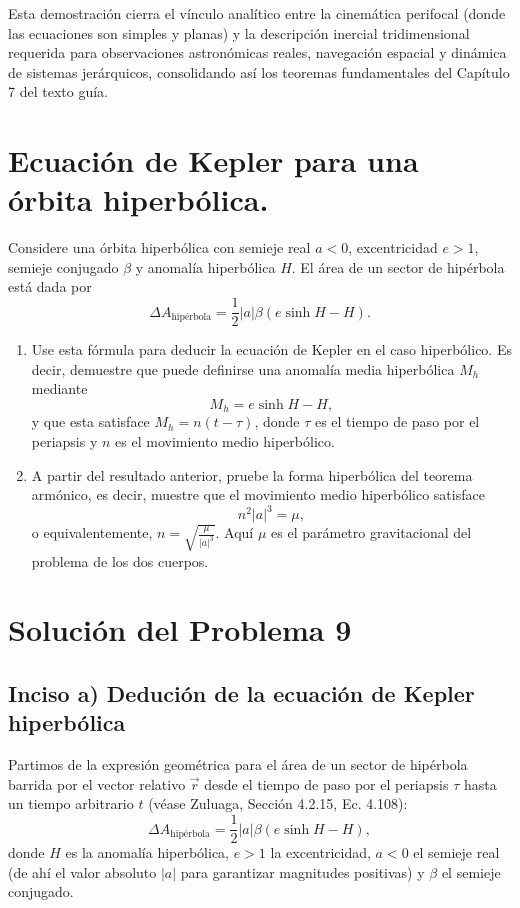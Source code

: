 \documentclass[12pt, a4paper]{article}
\begin{document}
Esta demostración cierra el vínculo analítico entre la cinemática perifocal (donde las ecuaciones son simples y planas) y la descripción inercial tridimensional requerida para observaciones astronómicas reales, navegación espacial y dinámica de sistemas jerárquicos, consolidando así los teoremas fundamentales del Capítulo 7 del texto guía.






\section{Ecuación de Kepler para una órbita hiperbólica.} Considere una órbita hiperbólica con semieje real $a < 0$, excentricidad $e > 1$, semieje conjugado $\beta$ y anomalía hiperbólica $H$. El área de un sector de hipérbola está dada por
$$\Delta A_{\text{hipérbola}} = \frac{1}{2} |a| \beta (e \sinh H - H).$$
\begin{enumerate}
    \item[a)] Use esta fórmula para deducir la ecuación de Kepler en el caso hiperbólico. Es decir, demuestre que puede definirse una anomalía media hiperbólica $M_h$ mediante
    $$M_h = e \sinh H - H,$$
    y que esta satisface $M_h = n(t - \tau)$, donde $\tau$ es el tiempo de paso por el periapsis y $n$ es el movimiento medio hiperbólico.
    \item[b)] A partir del resultado anterior, pruebe la forma hiperbólica del teorema armónico, es decir, muestre que el movimiento medio hiperbólico satisface
    $$n^2 |a|^3 = \mu,$$
    o equivalentemente, $n = \sqrt{\frac{\mu}{|a|^3}}$. Aquí $\mu$ es el parámetro gravitacional del problema de los dos cuerpos.
\end{enumerate}



\section*{Solución del Problema 9}

\subsection*{Inciso a) Dedución de la ecuación de Kepler hiperbólica}
Partimos de la expresión geométrica para el área de un sector de hipérbola barrida por el vector relativo $\vec{r}$ desde el tiempo de paso por el periapsis $\tau$ hasta un tiempo arbitrario $t$ (véase Zuluaga, Sección 4.2.15, Ec. 4.108):
$$
\Delta A_{\text{hipérbola}} = \frac{1}{2} |a| \beta \left( e \sinh H - H \right),
$$
donde $H$ es la anomalía hiperbólica, $e > 1$ la excentricidad, $a < 0$ el semieje real (de ahí el valor absoluto $|a|$ para garantizar magnitudes positivas) y $\beta$ el semieje conjugado.
\end{document}
